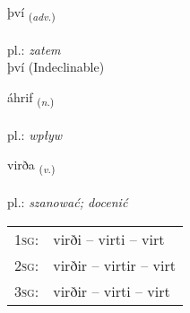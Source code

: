 \documentclass[frontgrid, backgrid]{flacards}\usepackage[]{graphicx}\usepackage[]{xcolor}
\begin{document}
{því \small{\textsubscript{(\textit{adv.})}} \\[1ex]
\textphonetic{[θviː]} \\
pl.: \emph{zatem} \\  [2ex]
því (Indeclinable)}

\renewcommand{\flhead}{\vskip5pt \fboxsep=0pt {\small\bfseries\footnotesize Nafnorð | rzeczownik}}
\renewcommand{\fcfoot}{\vskip5pt \fboxsep=0pt \hspace{2pt}{\small\bfseries\footnotesize 1K}}

\renewcommand{\blhead}{\vskip5pt {\small\bfseries\footnotesize Nafnorð | rzeczownik }}
\renewcommand{\bcfoot}{\vskip5pt \hspace{2pt}{\small\bfseries\footnotesize 1K}}


{áhrif \small{\textsubscript{(\textit{n.})}} \\[1ex] %
\textphonetic{[auːr̥ɪv]} \\
pl.: \emph{wpływ} \\  [2ex]
\renewcommand*{\arraystretch}{0.8}
}

\renewcommand{\flhead}{\vskip5pt \fboxsep=0pt {\small\bfseries\footnotesize Sagnorð | czasownik}}
\renewcommand{\fcfoot}{\vskip5pt \fboxsep=0pt \hspace{2pt}{\small\bfseries\footnotesize 1K}}

\renewcommand{\blhead}{\vskip5pt {\small\bfseries\footnotesize Sagnorð | czasownik }}
\renewcommand{\bcfoot}{\vskip5pt \hspace{2pt}{\small\bfseries\footnotesize 1K}}


{virða \small{\textsubscript{(\textit{v.})}} \\[1ex] %
\textphonetic{[vɪrða]} \\
pl.: \emph{szanować; docenić} \\  [2ex]
\renewcommand*{\arraystretch}{0.8}
\begin{tabular}{p{1cm}l}
\textsc{1sg}: & virði -- virti -- virt \\ 
\textsc{2sg}: & virðir -- virtir -- virt \\ 
\textsc{3sg}: & virðir -- virti -- virt \\ 
\end{tabular}
}
\end{document}
